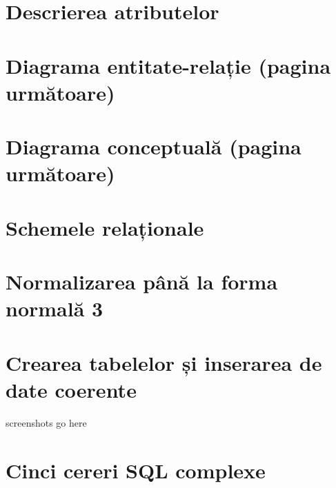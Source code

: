 \documentclass[a4paper, oneside, 12pt]{article}
\begin{document}
\section{Descrierea atributelor}

\section{Diagrama entitate-relație (pagina următoare)}



\section{Diagrama conceptuală (pagina următoare)}



\section{Schemele relaționale}

\begin{center}



\end{center}

\section{Normalizarea până la forma normală 3}

\section{Crearea tabelelor și inserarea de date coerente}

screenshots go here

\section{Cinci cereri SQL complexe}
\end{document}
